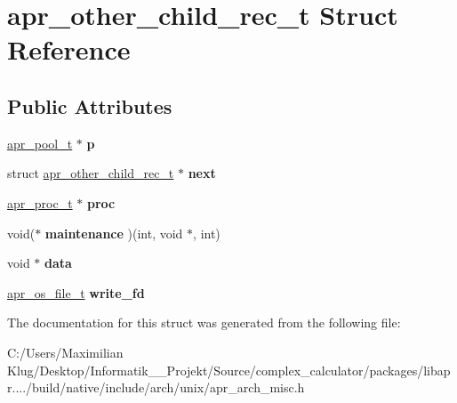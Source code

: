 \hypertarget{structapr__other__child__rec__t}{}\section{apr\+\_\+other\+\_\+child\+\_\+rec\+\_\+t Struct Reference}
\label{structapr__other__child__rec__t}
\subsection*{Public Attributes}
\begin{DoxyCompactItemize}
\item 
\mbox{\label{structapr__other__child__rec__t_a9673858fcba658ce915f117f5074ae5b}} 
\mbox{\hyperlink{group__apr__pools_gaf137f28edcf9a086cd6bc36c20d7cdfb}{apr\+\_\+pool\+\_\+t}} $\ast$ {\bfseries p}
\item 
\mbox{\label{structapr__other__child__rec__t_aea03c4592b125802cea8dedb112fe813}} 
struct \mbox{\hyperlink{structapr__other__child__rec__t}{apr\+\_\+other\+\_\+child\+\_\+rec\+\_\+t}} $\ast$ {\bfseries next}
\item 
\mbox{\label{structapr__other__child__rec__t_ad92d3343ce25898c8246e1d88dba9d8d}} 
\mbox{\hyperlink{structapr__proc__t}{apr\+\_\+proc\+\_\+t}} $\ast$ {\bfseries proc}
\item 
\mbox{\label{structapr__other__child__rec__t_a6084c939d2dd9b31548775260b209be4}} 
void($\ast$ {\bfseries maintenance} )(int, void $\ast$, int)
\item 
\mbox{\label{structapr__other__child__rec__t_a3d3fcefe86e50a24c211db82c9a9275e}} 
void $\ast$ {\bfseries data}
\item 
\mbox{\label{structapr__other__child__rec__t_ae73e10a3613921ac266baf2e9278fa37}} 
\mbox{\hyperlink{group__apr__portabile_ga885491b889a4a719549650d3a370fd34}{apr\+\_\+os\+\_\+file\+\_\+t}} {\bfseries write\+\_\+fd}
\end{DoxyCompactItemize}


The documentation for this struct was generated from the following file\+:\begin{DoxyCompactItemize}
\item 
C\+:/\+Users/\+Maximilian Klug/\+Desktop/\+Informatik\+\_\+\_\+\+Projekt/\+Source/complex\+\_\+calculator/packages/libapr..../build/native/include/arch/unix/apr\+\_\+arch\+\_\+misc.\+h\end{DoxyCompactItemize}
